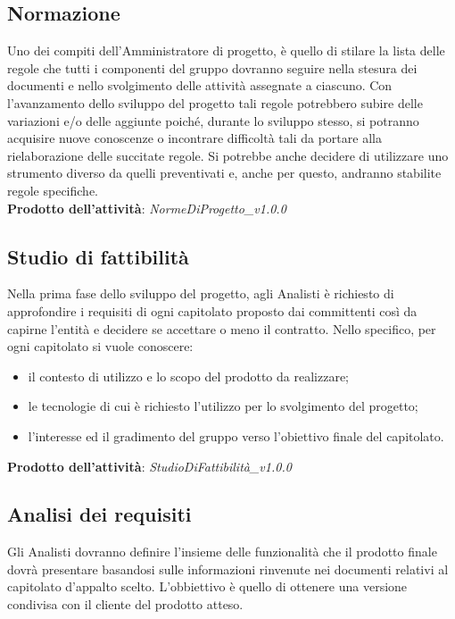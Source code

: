 \documentclass[11pt,a4paper]{article}
\begin{document}
	
	\subsection{Normazione}
	Uno dei compiti dell'Amministratore di progetto, è quello di stilare la lista delle regole che tutti i componenti del gruppo dovranno seguire nella stesura dei documenti e nello svolgimento delle attività assegnate a ciascuno. Con l'avanzamento dello sviluppo del progetto tali regole potrebbero subire delle variazioni e/o delle aggiunte poiché, durante lo sviluppo stesso, si potranno acquisire nuove conoscenze o incontrare difficoltà tali da portare alla rielaborazione delle succitate regole. Si potrebbe anche decidere di utilizzare uno strumento diverso da quelli preventivati e, anche per questo, andranno stabilite regole specifiche.\\
	\textbf{Prodotto dell'attività}: \textit{NormeDiProgetto\_v1.0.0}
	
	\subsection{Studio di fattibilità}
	Nella prima fase dello sviluppo del progetto, agli Analisti è richiesto di approfondire i requisiti di ogni capitolato proposto dai committenti così da capirne l'entità e decidere se accettare o meno il contratto. Nello specifico, per ogni capitolato si vuole conoscere:
	\begin{itemize}
		\item il contesto di utilizzo e lo scopo del prodotto da realizzare;
		\item le tecnologie di cui è richiesto l'utilizzo per lo svolgimento del progetto;
		\item l'interesse ed il gradimento del gruppo verso l'obiettivo finale del capitolato.
	\end{itemize}
	\textbf{Prodotto dell'attività}: \textit{StudioDiFattibilità\_v1.0.0}
	
	\subsection{Analisi dei requisiti}
	Gli Analisti dovranno definire l'insieme delle funzionalità che il prodotto finale dovrà presentare basandosi sulle informazioni rinvenute nei documenti relativi al capitolato d'appalto scelto. L'obbiettivo è quello di ottenere una versione condivisa con il cliente del prodotto atteso.\\
	
\end{document}
